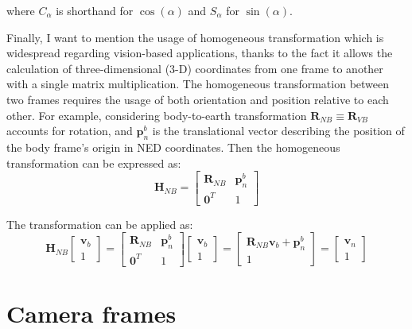 where $C_\alpha$ is shorthand for $\cos(\alpha)$ and $S_\alpha$ for $\sin(\alpha)$.

Finally, I want to mention the usage of homogeneous transformation which is widespread regarding vision-based applications, thanks to the fact it allows the calculation of three-dimensional (3-D) coordinates from one frame to another with a single matrix multiplication. The homogeneous transformation between two frames requires the usage of both orientation and position relative to each other. For example, considering body-to-earth transformation $\mathbf{R}_{NB}\equiv\mathbf{R}_{VB}$ accounts for rotation, and $\mathbf{p}_n^b$ is the translational vector describing the position of the body frame's origin in NED coordinates. Then the homogeneous transformation can be expressed as:
\begin{equation}
    \mathbf{H}_{NB}=\begin{bmatrix}
        \mathbf{R}_{NB} & \mathbf{p}_n^b \\
        \mathbf{0}^T & 1
    \end{bmatrix}
    \label{eq:hom-e2b}
\end{equation}

The transformation can be applied as:
\begin{equation}
    \mathbf{H}_{NB}\begin{bmatrix}
        \mathbf{v}_b \\ 1
    \end{bmatrix}=\begin{bmatrix}
        \mathbf{R}_{NB} & \mathbf{p}_n^b\\
        \mathbf{0}^T & 1
    \end{bmatrix}\begin{bmatrix}
        \mathbf{v}_b \\ 1
    \end{bmatrix}=\begin{bmatrix}
    \mathbf{R}_{NB}\mathbf{v}_b+\mathbf{p}_n^b \\ 1
    \end{bmatrix} = \begin{bmatrix}
        \mathbf{v}_n \\ 1
    \end{bmatrix}
\end{equation}

\section{Camera frames}

